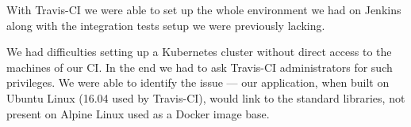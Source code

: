 With Travis-CI we were able to set up the whole environment we had on Jenkins along with the
integration tests setup we were previously lacking.

We had difficulties setting up a Kubernetes cluster without direct access to the machines of our CI.
In the end we had to ask Travis-CI
administrators for such privileges. We were able to identify the issue --- our application, when
built on Ubuntu Linux (16.04 used by Travis-CI), would link to the standard libraries, not present
on Alpine Linux used as a Docker image base.


